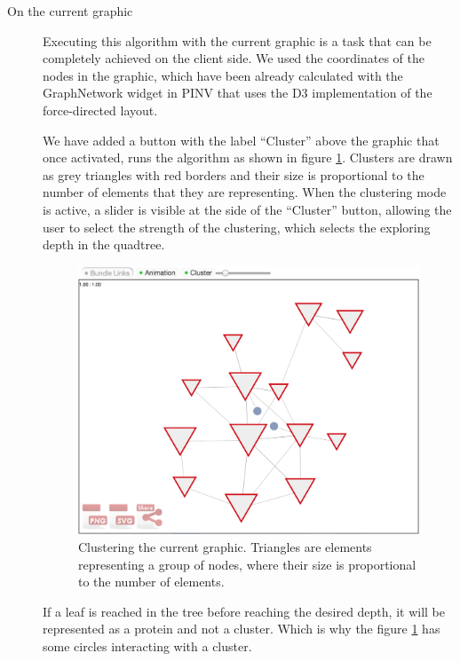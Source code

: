 \begin{description}
\item[On the current graphic]
Executing this algorithm with the current graphic is a task that can be completely achieved on the client side. We used the coordinates of the nodes in the graphic, which have been already calculated with the GraphNetwork widget in PINV that uses the D3 implementation of the force-directed layout. 

We have added a button with the label ``Cluster'' above the graphic that once activated, runs the algorithm as shown in figure \ref{fig:local_cluster}. Clusters are drawn as grey triangles with red borders and their size is proportional to the number of elements that they are representing. When the clustering mode is active, a slider is visible at the side of the ``Cluster'' button, allowing the user to select the strength of the clustering, which selects the exploring depth in the quadtree.

\begin{figure}[ht]
\centering
\includegraphics[width=\textwidth]{figures/local_cluster.png}
\caption[Clustering the current graphic.]{Clustering the current graphic. Triangles are elements representing a group of nodes, where their size is proportional to the number of elements.
\label{fig:local_cluster}}
\end{figure}

If a leaf is reached in the tree before reaching the desired depth, it will be represented as a protein and not a cluster. Which is why the figure \ref{fig:local_cluster} has some circles interacting with a cluster.


\end{description}
